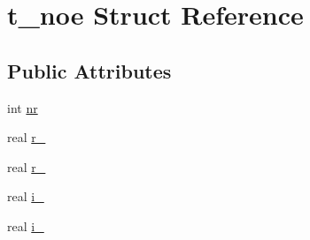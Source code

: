 \hypertarget{structt__noe}{\section{t\-\_\-noe \-Struct \-Reference}
\label{structt__noe}
}
\subsection*{\-Public \-Attributes}
\begin{DoxyCompactItemize}
\item 
int \hyperlink{structt__noe_aa823322694ad7756ff245c228d1cfe2a}{nr}
\item 
real \hyperlink{structt__noe_afd19c1d6093e43bd4672fdf4fc4eec76}{r\-\_}
\item 
real \hyperlink{structt__noe_a69c7d2965b6fa70170a016fb5de4da16}{r\-\_}
\item 
real \hyperlink{structt__noe_a29b76076f8b0b21e9dae1e9ff344b917}{i\-\_}
\item 
real \hyperlink{structt__noe_a0a33adaeea4660822af8be3a84282add}{i\-\_}
\end{DoxyCompactItemize}


